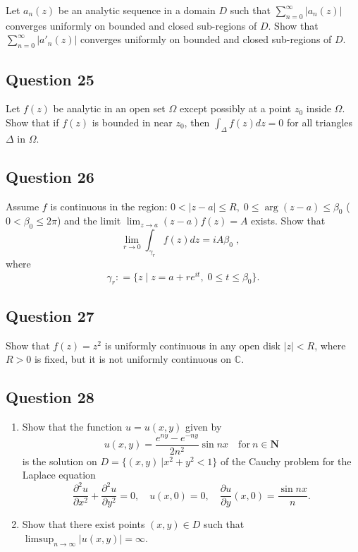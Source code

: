 \documentclass[12pt]{article}
\begin{document}
Let \(a_n(z)\) be an analytic sequence in a domain \(D\) such that
\(\displaystyle \sum_{n=0}^\infty |a_n(z)|\) converges uniformly on
bounded and closed sub-regions of \(D\). Show that
\(\displaystyle \sum_{n=0}^\infty |a'_n(z)|\) converges uniformly on
bounded and closed sub-regions of \(D\).

\hypertarget{question-25-2}{%
\subsection{Question 25}\label{question-25-2}}

Let \(f(z)\) be analytic in an open set \(\Omega\) except possibly at a
point \(z_0\) inside \(\Omega\). Show that if \(f(z)\) is bounded in
near \(z_0\), then \(\displaystyle \int_\Delta f(z) dz = 0\) for all
triangles \(\Delta\) in \(\Omega\).

\hypertarget{question-26-2}{%
\subsection{Question 26}\label{question-26-2}}

Assume \(f\) is continuous in the region:
\(0< |z-a| \leq R, \; 0 \leq \arg(z-a) \leq \beta_0\)
(\(0 < \beta_0 \leq 2 \pi\)) and the limit
\(\displaystyle \lim_{z \rightarrow a} (z-a) f(z) = A\) exists. Show
that
\[\lim_{r \rightarrow 0} \int_{\gamma_r} f(z) dz  = i A \beta_0 \; , \; \;\]
where
\[\gamma_r : = \{ z \; | \; z = a + r e^{it}, \; 0 \leq  t \leq \beta_0 \}.\]

\hypertarget{question-27-2}{%
\subsection{Question 27}\label{question-27-2}}

Show that \(f(z) = z^2\) is uniformly continuous in any open disk
\(|z| < R\), where \(R>0\) is fixed, but it is not uniformly continuous
on \(\mathbb C\).

\hypertarget{question-28-2}{%
\subsection{Question 28}\label{question-28-2}}

\begin{enumerate}
\def\labelenumi{(\arabic{enumi})}
\item
  Show that the function \(u=u(x,y)\) given by
  \[u(x,y)=\frac{e^{ny}-e^{-ny}}{2n^2}\sin nx\quad \text{for}\ n\in {\mathbf N}\]
  is the solution on \(D=\{(x,y)\ | x^2+y^2<1\}\) of the Cauchy problem
  for the Laplace equation
  \[\frac{\partial ^2u}{\partial x^2}+\frac{\partial ^2u}{\partial y^2}=0,\quad
  u(x,0)=0,\quad \frac{\partial u}{\partial y}(x,0)=\frac{\sin nx}{n}.\]
\item
  Show that there exist points \((x,y)\in D\) such that
  \(\displaystyle{\limsup_{n\to\infty} |u(x,y)|=\infty}\).
\end{enumerate}
\end{document}
